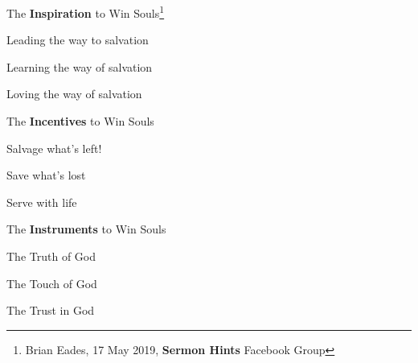 \begin{compactenum}[I.]
    \item The \textbf{Inspiration} to Win Souls\footnote{Brian Eades, 17 May 2019, \textbf{Sermon Hints} Facebook Group}
    \begin{compactenum}[A.]
        \item Leading the way to salvation
        \item Learning the way of salvation
        \item Loving the way of salvation
    \end{compactenum}
    \item The \textbf{Incentives} to Win Souls
    \begin{compactenum}[A.]
        \item Salvage what's left!
        \item Save what's lost
        \item Serve with life
    \end{compactenum}
    \item The \textbf{Instruments} to Win Souls
    \begin{compactenum}[A.]
    \item The Truth of God
        \item The Touch of God
        \item The Trust in God
    \end{compactenum}
\end{compactenum}

